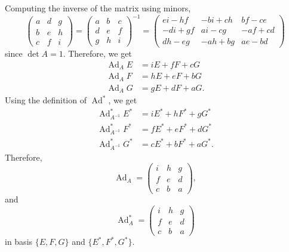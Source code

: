 \documentclass[a4paper, 12pt]{article}
\theoremstyle{Mydefinition}
\theoremstyle{Mytheorem}
\DeclareMathOperator{\Ad}{Ad}
\begin{document}
\begin{enumerate}
Computing the inverse of the matrix using minors,
\begin{equation*}
    \begin{pmatrix}
        a & d & g\\
        b & e & h\\
        c & f & i
    \end{pmatrix}=\begin{pmatrix}
        a & b & c\\
        d & e & f\\
        g & h & i
    \end{pmatrix}^{-1}=\begin{pmatrix}
        ei-hf & -bi+ch & bf-ce\\
        -di+gf & ai-cg & -af+cd\\
        dh-eg & -ah+bg & ae-bd
    \end{pmatrix}
\end{equation*}
since $\det A = 1$. Therefore, we get
\begin{equation*}
\begin{split}
    \Ad_A E &= iE+fF + cG\\
    \Ad_A F &= hE+eF + bG\\
    \Ad_A G &= gE+dF + aG.
\end{split}
\end{equation*}
Using the definition of $\Ad^*$, we get
\begin{equation*}
\begin{split}
    \Ad_{A^{-1}}^* E^* &= iE^*+hF^* + gG^*\\
    \Ad_{A^{-1}}^* F^* &= fE^*+eF^* + dG^*\\
    \Ad_{A^{-1}}^* G^* &= cE^*+bF^* + aG^*.
\end{split}
\end{equation*}
Therefore,
\begin{equation*}
    \Ad_{A} = \begin{pmatrix}
        i & h & g\\
        f & e & d\\
        c & b & a
    \end{pmatrix},
\end{equation*}
and
\begin{equation*}
    \Ad_{A}^* = \begin{pmatrix}
        i & h & g\\
        f & e & d\\
        c & b & a
    \end{pmatrix}
\end{equation*}
in basis $\{E,F,G\}$ and $\{E^*, F^*, G^*\}$. 


\end{enumerate}
\end{document}

